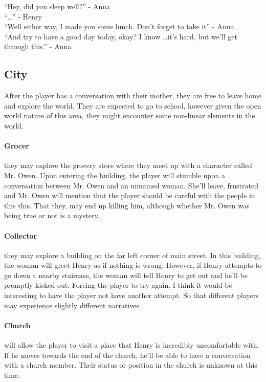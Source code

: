 \documentclass[12pt, a4paper, titlepage]{article}
\begin{document}
            ``Hey, did you sleep well?'' - Anna\\
            ``\ldots'' - Henry\\
            ``Well either way, I made you some lunch. Don't forget to take it'' - Anna\\
            ``And try to have a good day today, okay? I know \ldots it's hard, but we'll get through this.'' - Anna

        \subsection{City}

            After the player has a conversation with their mother, they are free to leave home and explore the world. They are
            expected to go to school, however given the open world nature of this area, they might encounter some non-linear elements in the
            world.
            
            \paragraph{Grocer} they may explore the grocery store where they meet up with a character called Mr. Owen. Upon entering the building, the player
            will stumble upon a conversation between Mr. Owen and an unnamed woman. She'll leave, frustrated and Mr. Owen will mention that the player
            should be careful with the people in this this. That they, may end up killing him, although whether Mr. Owen was being true or not is a mystery.
            
            \paragraph{Collector} they may explore a building on the far left corner of main street. In this building, the woman will greet Henry as if
            nothing is wrong. However, if Henry attempts to go down a nearby staircase, the woman will tell Henry to get out and he'll be promptly kicked out. Forcing
            the player to try again. I think it would be interesting to have the player not have another attempt. So that different players may experience slightly different
            narratives.
            
            \paragraph{Church} will allow the player to visit a place that Henry is incredibly uncomfortable with. If he moves towards the end of the church, he'll be able
            to have a conversation with a church member. Their status or position in the church is unknown at this time.\\~\\
            
\end{document}
